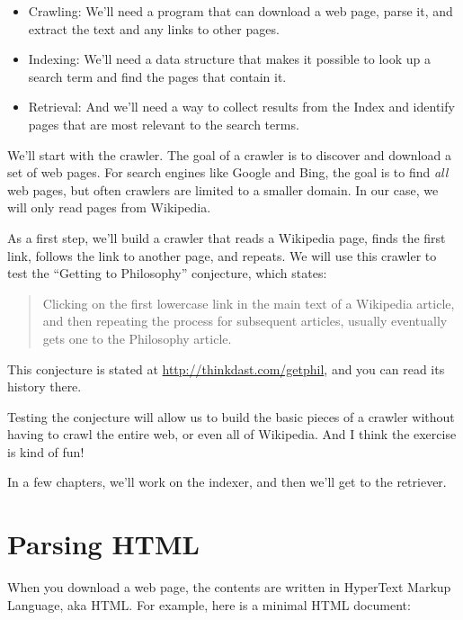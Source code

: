 \documentclass[12pt]{book}
\theoremstyle{exercise}
\begin{document}
\begin{itemize}

\item
  Crawling: We'll need a program that can download a web page, parse it,
  and extract the text and any links to other pages.

\item
  Indexing: We'll need a data structure that makes it possible to look up a
  search term and find the pages that contain it.

\item
  Retrieval: And we'll need a way to collect results from the Index and
  identify pages that are most relevant to the search terms.

\end{itemize}

We'll start with the crawler.  The goal of a crawler is to discover and
download a set of web pages. For search engines like Google and Bing,
the goal is to find \emph{all} web pages, but often crawlers are limited
to a smaller domain. In our case, we will only read pages from
Wikipedia.


As a first step, we'll build a crawler that reads a Wikipedia page,
finds the first link, follows the link to another page, and repeats. We
will use this crawler to test the ``Getting to Philosophy'' conjecture,
which states:

\begin{quote}
Clicking on the first lowercase link in the main text of a
Wikipedia article, and then repeating the process for subsequent
articles, usually eventually gets one to the Philosophy article.
\end{quote}

This conjecture is stated at
\url{http://thinkdast.com/getphil}{},
and you can read its history there.

Testing the conjecture will allow us to build the basic pieces of a
crawler without having to crawl the entire web, or even all of
Wikipedia. And I think the exercise is kind of fun!

In a few chapters, we'll work on the indexer, and then we'll get to the
retriever.

\section{Parsing HTML}
\label{parsing-html}

When you download a web page, the contents are written in
HyperText Markup Language, aka HTML.
For example, here is a minimal HTML document:
\end{document}
